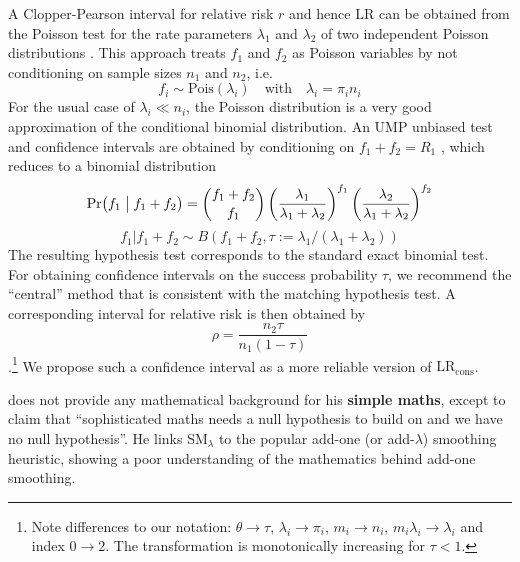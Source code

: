 \documentclass[a4paper]{article}
\newcommand{\LR}{\text{LR}}     %
\newcommand{\LRC}{\text{LR}_{\text{cons}}} %
\begin{document}
A Clopper-Pearson interval for relative risk $r$ and hence $\LR$ can be obtained from the Poisson test for the rate parameters $\lambda_1$ and $\lambda_2$ of two independent Poisson distributions \citet[55]{Fay:10a}.  This approach treats $f_1$ and $f_2$ as Poisson variables by not conditioning on sample sizes $n_1$ and $n_2$, i.e.\
\begin{equation}
  \label{eq:poisson-approximation}
  f_i \sim \text{Pois}(\lambda_i) \quad \text{with} \quad \lambda_i = \pi_i n_i
\end{equation}
For the usual case of $\lambda_i \ll n_i$, the Poisson distribution is a very good approximation of the conditional binomial distribution.  An UMP unbiased test and confidence intervals are obtained by conditioning on $f_1 + f_2 = R_1$ \citep[125]{Lehmann:Romano:05}, which reduces to a binomial distribution
\begin{equation}
  \label{eq:poisson-conditional-1}
  \mathop{\mathrm{Pr}}\bigl(f_1\bigm|f_1 + f_2\bigr) = \binom{f_1 + f_2}{f_1}
  \left( \frac{\lambda_1}{\lambda_1 + \lambda_2} \right)^{f_1}
  \left( \frac{\lambda_2}{\lambda_1 + \lambda_2} \right)^{f_2}
\end{equation}
\begin{equation}
  \label{eq:poisson-conditional-2}
  f_1 | f_1 + f_2 \sim B(f_1 + f_2, \tau := \lambda_1 / (\lambda_1 + \lambda_2))
\end{equation}
The resulting hypothesis test \citep[314ff]{Przyborowski:Wilenski:40} corresponds to the standard exact binomial test.  For obtaining confidence intervals on the success probability $\tau$, we recommend the ``central'' method \citep[53]{Fay:10a} that is consistent with the matching hypothesis test.  A corresponding interval for relative risk is then obtained by
\begin{equation}
  \label{eq:poisson-ratio-to-rho}
  \rho = \frac{n_2 \tau}{n_1 (1 - \tau)}
\end{equation}
\citep[55]{Fay:10a}.\footnote{Note differences to our notation: $\theta \to \tau$, $\lambda_i \to \pi_i$, $m_i \to n_i$, $m_i \lambda_i \to \lambda_i$ and index $0 \to 2$.  The transformation is monotonically increasing for $\tau < 1$.} We propose such a confidence interval as a more reliable version of $\LRC$.


\citet{Kilgarriff:09} does not provide any mathematical background for his \textbf{simple maths}, except to claim that ``sophisticated maths needs a null hypothesis to build on and we have no null hypothesis''. He links SM$_{\lambda}$ to the popular add-one (or add-$\lambda$) smoothing heuristic, showing a poor understanding of the mathematics behind add-one smoothing.
\end{document}
